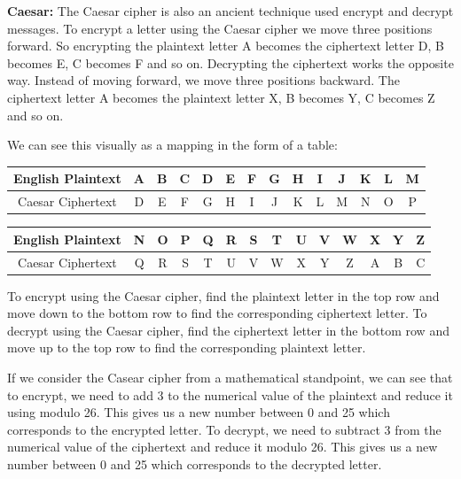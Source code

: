 {\bf Caesar:} The Caesar cipher is also an ancient technique used encrypt and decrypt messages. To encrypt a letter using the Caesar cipher we move three positions forward. So encrypting the plaintext letter A becomes the ciphertext letter D, B becomes E, C becomes F and so on. Decrypting the ciphertext works the opposite way. Instead of moving forward, we move three positions backward. The ciphertext letter A becomes the plaintext letter X, B becomes Y, C becomes Z and so on.

We can see this visually as a mapping in the form of a table:

\Large
\begin{center}
  \begin{tabular}{|c|c|c|c|c|c|c|c|c|c|c|c|c|c|}
  \hline
    English Plaintext & A & B & C & D & E & F & G & H & I & J & K & L & M \\ \hline
	Caesar Ciphertext & D & E & F & G & H & I & J & K & L & M & N & O & P \\ \hline
  \end{tabular}
\end{center}

\begin{center}
  \begin{tabular}{|c|c|c|c|c|c|c|c|c|c|c|c|c|c|}
  \hline
    English Plaintext & N & O & P & Q & R & S & T & U & V & W & X & Y & Z \\ \hline
    Caesar Ciphertext & Q & R & S & T & U & V & W & X & Y & Z & A & B & C \\ \hline
  \end{tabular}
\end{center}

\normalsize

To encrypt using the Caesar cipher, find the plaintext letter in the top row and move down to the bottom row to find the corresponding ciphertext letter. To decrypt using the Caesar cipher, find the ciphertext letter in the bottom row and move up to the top row to find the corresponding plaintext letter.

If we consider the Casear cipher from a mathematical standpoint, we can see that to encrypt, we need to add 3 to the numerical value of the plaintext and reduce it using modulo 26. This gives us a new number between 0 and 25 which corresponds to the encrypted letter. To decrypt, we need to subtract 3 from the numerical value of the ciphertext and reduce it modulo 26. This gives us a new number between 0 and 25 which corresponds to the decrypted letter.

